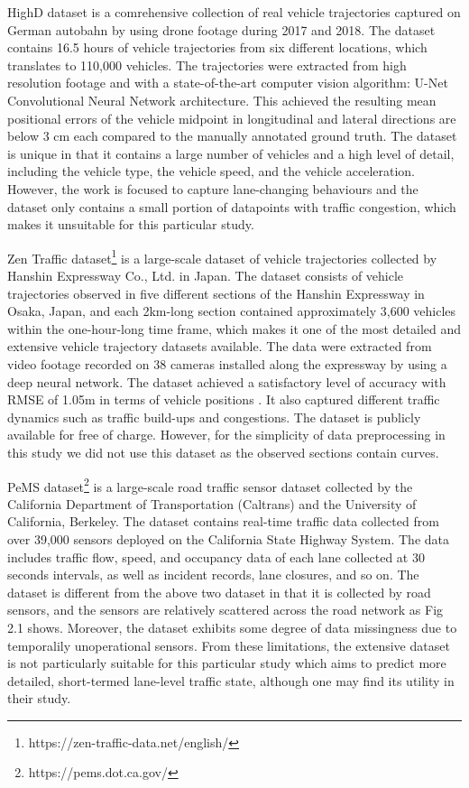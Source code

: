 \documentclass[11pt]{uonthesis}
\begin{document}
HighD dataset \cite{highDdataset} is a comrehensive collection of real vehicle trajectories captured on German autobahn by using drone footage during 2017 and 2018. The dataset contains 16.5 hours of vehicle trajectories from six different locations, which translates to 110,000 vehicles. The trajectories were extracted from high resolution footage and with a state-of-the-art computer vision algorithm: U-Net Convolutional Neural Network architecture. This achieved the resulting mean positional errors of the vehicle midpoint in longitudinal and lateral directions are below 3 cm each compared to the manually annotated ground truth. The dataset is unique in that it contains a large number of vehicles and a high level of detail, including the vehicle type, the vehicle speed, and the vehicle acceleration. However, the work is focused to capture lane-changing behaviours and the dataset only contains a small portion of datapoints with traffic congestion, which makes it unsuitable for this particular study.

Zen Traffic dataset\footnote{https://zen-traffic-data.net/english/} is a large-scale dataset of vehicle trajectories collected by Hanshin Expressway Co., Ltd. in Japan. The dataset consists of vehicle trajectories observed in five different sections of the Hanshin Expressway in Osaka, Japan, and each 2km-long section contained approximately 3,600 vehicles within the one-hour-long time frame, which makes it one of the most detailed and extensive vehicle trajectory datasets available. The data were extracted from video footage recorded on 38 cameras installed along the expressway by using a deep neural network. The dataset achieved a satisfactory level of accuracy with RMSE of 1.05m in terms of vehicle positions \cite{seo2020evaluation}. It also captured different traffic dynamics such as traffic build-ups and congestions. The dataset is publicly available for free of charge. However, for the simplicity of data preprocessing in this study we did not use this dataset as the observed sections contain curves.

PeMS dataset\footnote{https://pems.dot.ca.gov/} is a large-scale road traffic sensor dataset collected by the California Department of Transportation (Caltrans) and the University of California, Berkeley. The dataset contains real-time traffic data collected from over 39,000 sensors deployed on the California State Highway System. The data includes traffic flow, speed, and occupancy data of each lane collected at 30 seconds intervals, as well as incident records, lane closures, and so on. The dataset is different from the above two dataset in that it is collected by road sensors, and the sensors are relatively scattered across the road network as Fig 2.1 shows. Moreover, the dataset exhibits some degree of data missingness due to temporalily unoperational sensors. From these limitations, the extensive dataset is not particularly suitable for this particular study which aims to predict more detailed, short-termed lane-level traffic state, although one may find its utility in their study.
\end{document}
